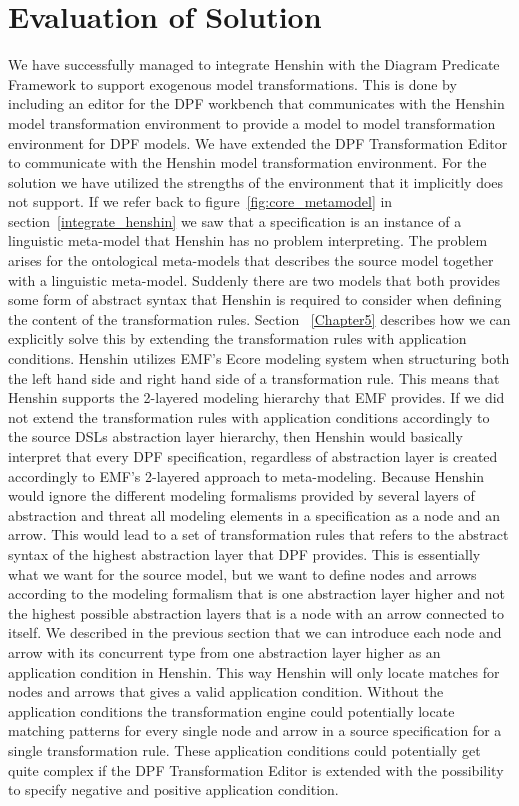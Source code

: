 \section{Evaluation of Solution}
\label{evaluate_solution}
We have successfully managed to integrate Henshin with the Diagram Predicate
Framework to support exogenous model transformations. This is done by including
an editor for the DPF workbench that communicates with the Henshin model
transformation environment to provide a model to model transformation
environment for DPF models. We have extended the DPF Transformation Editor to
communicate with the Henshin model transformation environment. For the solution
we have utilized the strengths of the environment that it implicitly does not
support. If we refer back to figure~\ref{fig:core_metamodel} in
section~\ref{integrate_henshin} we saw that a specification is an instance of a
linguistic meta-model that Henshin has no problem interpreting. The problem
arises for the ontological meta-models that describes the source model together
with a linguistic meta-model. Suddenly there are two models that both provides
some form of abstract syntax that Henshin is required to consider when defining
the content of the transformation rules. Section ~\ref{Chapter5} describes how
we can explicitly solve this by extending the transformation rules with
application conditions. Henshin utilizes EMF's Ecore modeling system when
structuring both the left hand side and right hand side of a transformation
rule. This means that Henshin supports the 2-layered modeling hierarchy that
EMF provides. If we did not extend the transformation rules with application
conditions accordingly to the source DSLs abstraction layer hierarchy, then
Henshin would basically interpret that every DPF specification, regardless of
abstraction layer is created accordingly to EMF's 2-layered approach to
meta-modeling. Because Henshin would ignore the different modeling formalisms
provided by several layers of abstraction and threat all modeling elements in a
specification as a node and an arrow. This would lead to a set of
transformation rules that refers to the abstract syntax of the highest
abstraction layer that DPF provides. This is essentially what we want for the
source model, but we want to define nodes and arrows according to the modeling
formalism that is one abstraction layer higher and not the highest possible
abstraction layers that is a node with an arrow connected to itself. We
described in the previous section that we can introduce each node and arrow
with its concurrent type from one abstraction layer higher as an application
condition in Henshin. This way Henshin will only locate matches for nodes and
arrows that gives a valid application condition. Without the application
conditions the transformation engine could potentially locate matching patterns
for every single node and arrow in a source specification for a single
transformation rule. These application conditions could potentially get quite
complex if the DPF Transformation Editor is extended with the possibility to
specify negative and positive application condition. 


